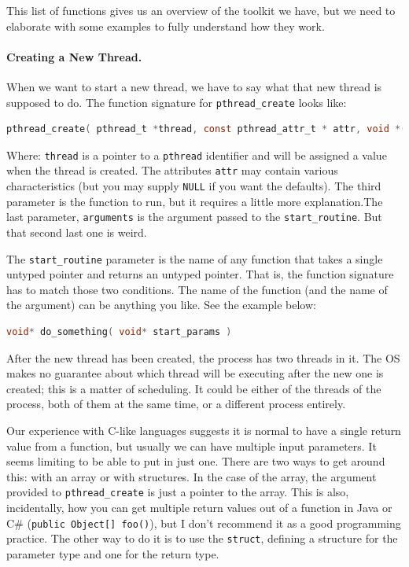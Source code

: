 This list of functions gives us an overview of the toolkit we have, but we need to elaborate with some examples to fully understand how they work.

\paragraph{Creating a New Thread.}

When we want to start a new thread, we have to say what that new thread is supposed to do. The function signature for \texttt{pthread\_create} looks like:

\begin{lstlisting}[language=C]
pthread_create( pthread_t *thread, const pthread_attr_t * attr, void *(*start_routine)( void * ), void *arg );
\end{lstlisting}

Where: \texttt{thread} is a pointer to a \texttt{pthread} identifier and will be assigned a value when the thread is created. The attributes \texttt{attr} may contain various characteristics (but you may supply \texttt{NULL} if you want the defaults). The third parameter is the function to run, but it requires a little more explanation.The last parameter, \texttt{arguments} is the argument passed to the \texttt{start\_routine}. But that second last one is weird.

The \texttt{start\_routine} parameter is the name of any function that takes a single untyped pointer and returns an untyped pointer. That is, the function signature has to match those two conditions. The name of the function (and the name of the argument) can be anything you like. See the example below:

\begin{lstlisting}[language=C]
void* do_something( void* start_params )
\end{lstlisting}


After the new thread has been created, the process has two threads in it. The OS makes no guarantee about which thread will be executing after the new one is created; this is a matter of scheduling. It could be either of the threads of the process, both of them at the same time, or a different process entirely.

Our experience with C-like languages suggests it is normal to have a single return value from a function, but usually we can have multiple input parameters. It seems limiting to be able to put in just one. There are two ways to get around this: with an array or with structures. In the case of the array, the argument provided to \texttt{pthread\_create} is just a pointer to the array. This is also, incidentally, how you can get multiple return values out of a function in Java or C\# (\texttt{public Object[] foo()}), but I don't recommend it as a good programming practice. The other way to do it is to use the \texttt{struct}, defining a structure for the parameter type and one for the return type.

